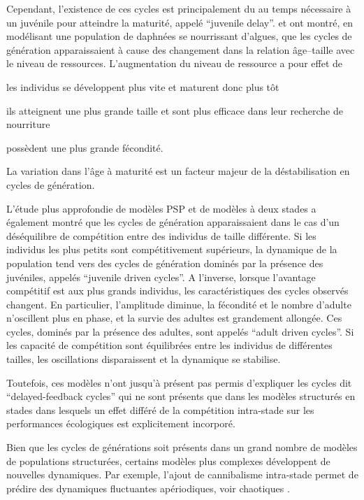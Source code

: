 Cependant, l'existence de ces cycles est principalement du au temps nécessaire à
un juvénile pour atteindre la maturité, appelé ``juvenile delay''.
\textcite{de-roos1990a} et \textcite{de-roos1997a} ont montré, en modélisant une
population de daphnées se nourrissant d'algues, que les cycles de génération
apparaissaient à cause des changement dans la relation âge--taille avec
le niveau de ressources. L'augmentation du niveau de ressource a pour effet de
\begin{enumerate*}[label=(\roman*), before=\unskip{ : }, itemjoin={{ ; }},
itemjoin*={{ ; et }}]\item les individus se développent plus vite et maturent
donc plus tôt \item ils atteignent une plus grande taille et sont plus efficace
dans leur recherche de nourriture \item possèdent une plus grande
fécondité.\end{enumerate*} La variation dans l'âge à maturité est un facteur
majeur de la déstabilisation en cycles de génération.

\label{competPopStru}L'étude plus approfondie de modèles PSP et de modèles à
deux stades \autocite[juvéniles et adultes, ][]{de-roos2003a} a également montré que les
cycles de génération apparaissaient dans le cas d'un déséquilibre de compétition
entre des individus de taille différente. Si les individus les plus petits sont
compétitivement supérieurs, la dynamique de la population tend vers des cycles
de génération dominés par la présence des juvéniles, appelés ``juvenile driven
cycles''. A l'inverse, lorsque l'avantage compétitif est aux plus grands
individus, les caractéristiques des cycles observés changent.
En particulier, l'amplitude diminue, la fécondité et le nombre d'adulte
n'oscillent plus en phase, et la survie des adultes est grandement allongée. Ces
cycles, dominés par la présence des adultes, sont appelés ``adult driven cycles''.
Si les capacité de compétition sont équilibrées entre les individus de
différentes tailles, les oscillations disparaissent et la dynamique se
stabilise. 

Toutefois, ces modèles n'ont jusqu'à présent pas permis d'expliquer
les cycles dit ``delayed-feedback cycles'' qui ne sont présents que dans les
modèles structurés en stades dans lesquels un effet différé de la compétition
intra-stade sur les performances écologiques est explicitement incorporé.

Bien que les cycles de générations soit présents dans un grand nombre de modèles
de populations structurées, certains modèles plus complexes développent de
nouvelles dynamiques. Par exemple, l'ajout de cannibalisme intra-stade permet de
prédire des dynamiques fluctuantes apériodiques, voir chaotiques
\autocites{costantino1997a,dennis1997a}.

